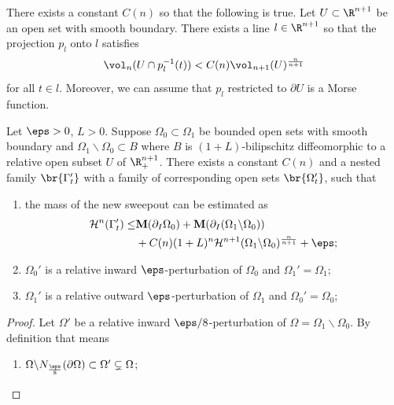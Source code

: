 \begin{theorem}[Falconer]\label{thm:falconer}
    There exists a constant $C(n)$ so that the following is true. Let $U \subset \R^{n + 1}$ be an open set with smooth boundary. There exists a line $l \in \R^{n + 1}$ so that the projection $p_l$ onto $l$ satisfies
    \begin{equation*}
        \vol_n(U\cap p^{-1}_l(t)) < C(n)\vol_{n + 1}(U)^{\frac{n}{n + 1}}
    \end{equation*}
    for all $t \in l$. Moreover, we can assume that $p_l$ restricted to $\partial U$ is a Morse function.
\end{theorem}
\begin{lemma}\label{lem:existence-nested-between-sets}
    Let $\eps > 0$, $L > 0$. Suppose $\Omega_0 \subset \Omega_1$ be bounded open sets with smooth boundary and $\Omega_1 \backslash \Omega_0 \subset B$ where $B$ is $(1 + L)$-bilipschitz diffeomorphic to a relative open subset $U$ of $\R^{n + 1}_+$. There exists a constant $C(n)$ and a nested family $\br{\Gamma_t'}$ with a family of corresponding open sets $\br{\Omega_t'}$, such that
    \begin{enumerate}
        \item[(1)] the mass of the new sweepout can be estimated as
        \begin{equation*}
            \begin{split}
                \mathcal{H}^n(\Gamma_t') \leq& \mathbf{M}(\partial_I\Omega_0) + \mathbf{M}(\partial_I(\Omega_1\backslash\Omega_0))\\
                &+ C(n)(1 + L)^n\mathcal{H}^{n + 1}(\Omega_1\backslash\Omega_0)^{\frac{n}{n + 1}} + \eps;
            \end{split}
        \end{equation*}
        \item[(2)] $\Omega_0'$ is a relative inward $\eps$-perturbation of $\Omega_0$ and $\Omega_1' = \Omega_1$;
        \item[(2')] $\Omega_1'$ is a relative outward $\eps$-perturbation of $\Omega_1$ and $\Omega_0' = \Omega_0$;
    \end{enumerate}
    \begin{proof}
        Let $\Omega'$ be a relative inward $\eps/8$-perturbation of $\Omega = \Omega_1\backslash\Omega_0$. By definition that means
        \begin{enumerate}
            \item[(a)] $\Omega\backslash N_\frac{\eps}{8}(\partial\Omega) \subset \Omega' \subsetneq \Omega$;

\end{enumerate}
\end{proof}
\end{lemma}

